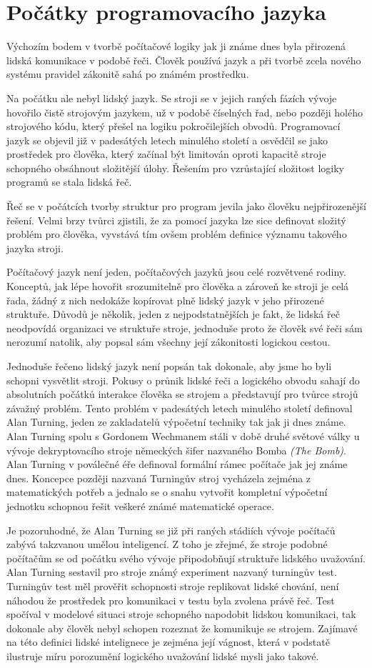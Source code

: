 \documentclass[10pt]{book}
\newcommand{\oddil}[1]{\section{#1}\index{#1}\label{#1}}
\begin{document}
\oddil{Počátky programovacího jazyka}

Výchozím bodem v tvorbě počítačové logiky jak ji známe dnes byla přirozená lidská komunikace v podobě řeči. Člověk používá jazyk  a při tvorbě zcela nového systému pravidel zákonitě sahá po známém prostředku.

Na počátku ale nebyl lidský jazyk. Se stroji se v jejich raných fázích vývoje hovořilo čistě strojovým jazykem, už v podobě číselných řad, nebo později holého strojového kódu, který přešel na logiku pokročilejších obvodů. Programovací jazyk se objevil již v padesátých letech minulého století a osvědčil se jako prostředek pro člověka, který začínal být limitován oproti kapacitě stroje schopného obsáhnout složitější úlohy. Řešením pro vzrůstající složitost logiky programů se stala lidská řeč.

Řeč se v počátcích tvorby struktur pro program jevila jako člověku nejpřirozenější řešení. Velmi brzy tvůrci zjistili, že za pomocí jazyka lze sice definovat složitý problém pro člověka, vyvstává tím ovšem problém definice významu takového jazyka stroji.

Počítačový jazyk není jeden, počítačových jazyků jsou celé rozvětvené rodiny. Konceptů, jak lépe hovořit srozumitelně pro člověka a zároveň ke stroji je celá řada, žádný z nich nedokáže kopírovat plně lidský jazyk v jeho přirozené struktuře. Důvodů je několik, jeden z nejpodstatnějších je fakt, že lidská řeč neodpovídá organizaci ve struktuře stroje, jednoduše proto že člověk své řeči sám nerozumí natolik, aby popsal sám všechny její zákonitosti logickou cestou.

Jednoduše řečeno lidský jazyk není popsán tak dokonale, aby jsme ho byli schopni vysvětlit stroji. Pokusy o průnik lidské řeči a logického obvodu sahají do absolutních počátků interakce člověka se strojem a představují pro tvůrce strojů závažný problém. Tento problém v padesátých letech minulého století definoval Alan Turning, jeden ze zakladatelů výpočetní techniky tak jak ji dnes známe. Alan Turning spolu s Gordonem Wechmanem stáli v době druhé světové války u vývoje dekryptovacího stroje německých šifer nazvaného Bomba {\em (The Bomb)}. Alan Turning v poválečné éře definoval formální rámec počítače jak jej známe dnes. Koncepce později nazvaná Turningův stroj vycházela zejména z matematických potřeb a jednalo se o snahu vytvořit kompletní výpočetní jednotku schopnou řešit veškeré známé matematické operace. 


Je pozoruhodné, že Alan Turning se již při raných stádiích vývoje počítačů zabývá takzvanou umělou inteligencí. Z toho je zřejmé, že stroje podobné počítačům se od počátku svého vývoje připodobňují struktuře lidského uvažování. Alan Turning sestavil pro stroje známý experiment nazvaný turningův test. Turningův test měl prověřit schopnosti stroje replikovat lidské chování, není náhodou že prostředek pro komunikaci v testu byla zvolena právě řeč. Test spočíval v modelové situaci stroje schopného napodobit lidskou komunikaci, tak dokonale aby člověk nebyl schopen rozeznat že komunikuje se strojem. Zajímavé na této definici lidské intelignece je zejména její vágnost, která v podstatě ilustruje míru porozumění logického uvažování lidské mysli jako takové.
\end{document}

